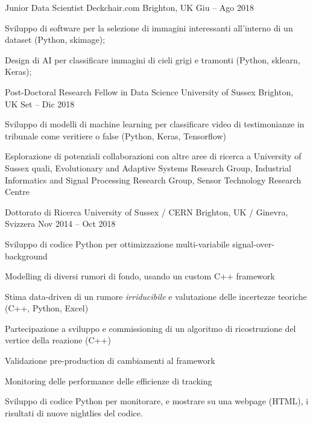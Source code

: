 \begin{cventries}
    \cventry
    {Junior Data Scientist}
    {Deckchair.com}
    {Brighton, UK}
    {Giu -- Ago 2018}
    {
      \begin{cvitems}
        \item Sviluppo di software per la selezione di immagini interessanti all'interno di un dataset (Python, skimage);
        \item Design di AI per classificare immagini di cieli grigi e tramonti (Python, sklearn, Keras);
      \end{cvitems}
    }
  \end{cventries}


  \begin{cventries}
    \cventry
    {Post-Doctoral Research Fellow in Data Science}
    {University of Sussex}
    {Brighton, UK}
    {Set -- Dic 2018}
    {
      \begin{cvitems}
        \item Sviluppo di modelli di machine learning per classificare video di testimonianze in tribunale come veritiere o false (Python, Keras, Tensorflow)
        \item Esplorazione di potenziali collaborazioni con altre aree di ricerca a University of Sussex quali, Evolutionary and Adaptive Systems Research Group, Industrial Informatics and Signal Processing Research Group, Sensor Technology Research Centre
      \end{cvitems}
    }
  \end{cventries}

  \begin{cventries}
    \cventry
    {Dottorato di Ricerca}
    {University of Sussex / CERN}
    {Brighton, UK / Ginevra, Svizzera}
    {Nov 2014 -- Oct 2018}
    {
    \begin{cvitems}
      \item Sviluppo di codice Python per ottimizzazione multi-variabile signal-over-background
      \item Modelling di diversi rumori di fondo, usando un custom C++ framework
      \item Stima data-driven di un rumore \emph{irriducibile} e valutazione delle incertezze teoriche (C++, Python, Excel)
      \item Partecipazione a sviluppo e commissioning di un algoritmo di ricostruzione del vertice della reazione (C++)
      \item Validazione pre-production di cambiamenti al framework
      \item Monitoring delle performance delle efficienze di tracking
      \item Sviluppo di codice Python per monitorare, e mostrare su una webpage (HTML), i risultati di nuove nightlies del codice.
    \end{cvitems}
    }
  \end{cventries}

